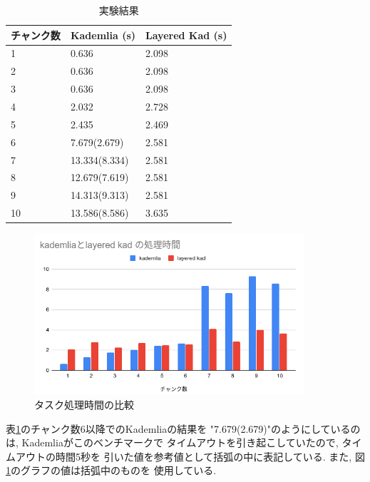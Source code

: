\documentclass[sotsuron]{jcsie}
\begin{document}
\begin{table}[H]
	\caption{実験結果}
	\centering
	\label{table:calc-result}
	\begin{tabular}{|l|l|l|}
		\hline
		チャンク数 &   
		Kademlia (s)    &   
		Layered Kad (s)\\ 
		\hline
		1               &   
		0.636           &   
		2.098\\
		\hline
		2               &   
		0.636           &   
		2.098\\
		\hline
		3               &   
		0.636           &   
		2.098\\
		\hline
		4               &   
		2.032           &   
		2.728\\
		\hline
		5               &   
		2.435           &   
		2.469\\
		\hline
		6               &   
		7.679(2.679)    &   
		2.581\\
		\hline
		7               &   
		13.334(8.334)    &   
		2.581\\
		\hline
		8               &   
		12.679(7.619)    &   
		2.581\\
		\hline
		9               &   
		14.313(9.313)    &   
		2.581\\
		\hline
		10               &   
		13.586(8.586)    &   
		3.635\\
		\hline
	\end{tabular}
\end{table}

\begin{figure}[H]
	\centering
	\includegraphics[width=10cm]{./assets/image/calc_compare.png}
	\caption{タスク処理時間の比較}
	\label{fig:calc_compare.png}
\end{figure}

表\ref{table:calc-result}のチャンク数6以降でのKademliaの結果を
"7.679(2.679)"のようにしているのは, Kademliaがこのベンチマークで
タイムアウトを引き起こしていたので, タイムアウトの時間5秒を
引いた値を参考値として括弧の中に表記している.
また, 図\ref{fig:calc_compare.png}のグラフの値は括弧中のものを
使用している.
\end{document}
